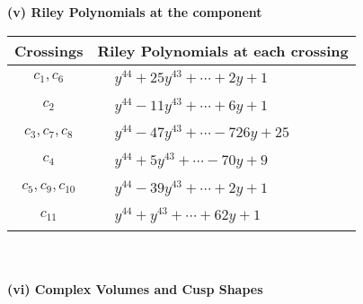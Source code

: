 \documentclass[1p]{elsarticle_modified}
\theoremstyle{definition}
\begin{document}
\newpage\renewcommand{\arraystretch}{1}
\flushleft \textbf{(v) Riley Polynomials at the component}\newline \\
\begin{tabular}{m{50pt}|m{274pt}}
Crossings & \hspace{64pt}Riley Polynomials at each crossing \\
\hline $$\begin{aligned}c_{1},c_{6}\end{aligned}$$&$\begin{aligned}
&y^{44}+25 y^{43}+\cdots+2 y+1
\end{aligned}$\\
\hline $$\begin{aligned}c_{2}\end{aligned}$$&$\begin{aligned}
&y^{44}-11 y^{43}+\cdots+6 y+1
\end{aligned}$\\
\hline $$\begin{aligned}c_{3},c_{7},c_{8}\end{aligned}$$&$\begin{aligned}
&y^{44}-47 y^{43}+\cdots-726 y+25
\end{aligned}$\\
\hline $$\begin{aligned}c_{4}\end{aligned}$$&$\begin{aligned}
&y^{44}+5 y^{43}+\cdots-70 y+9
\end{aligned}$\\
\hline $$\begin{aligned}c_{5},c_{9},c_{10}\end{aligned}$$&$\begin{aligned}
&y^{44}-39 y^{43}+\cdots+2 y+1
\end{aligned}$\\
\hline $$\begin{aligned}c_{11}\end{aligned}$$&$\begin{aligned}
&y^{44}+y^{43}+\cdots+62 y+1
\end{aligned}$\\
\hline
\end{tabular}\\~\\
\newpage\flushleft \textbf{(vi) Complex Volumes and Cusp Shapes}
\end{document}
